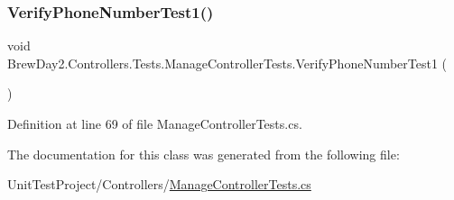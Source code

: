\mbox{\label{class_brew_day2_1_1_controllers_1_1_tests_1_1_manage_controller_tests_a5c75a704b464473413d777a604c4e5f2}} 
\subsubsection{\texorpdfstring{Verify\+Phone\+Number\+Test1()}{VerifyPhoneNumberTest1()}}
{\footnotesize\ttfamily void Brew\+Day2.\+Controllers.\+Tests.\+Manage\+Controller\+Tests.\+Verify\+Phone\+Number\+Test1 (\begin{DoxyParamCaption}{ }\end{DoxyParamCaption})}



Definition at line 69 of file Manage\+Controller\+Tests.\+cs.



The documentation for this class was generated from the following file\+:\begin{DoxyCompactItemize}
\item 
Unit\+Test\+Project/\+Controllers/\mbox{\hyperlink{_manage_controller_tests_8cs}{Manage\+Controller\+Tests.\+cs}}\end{DoxyCompactItemize}
